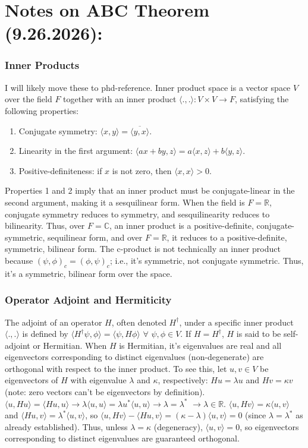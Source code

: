 \documentclass[11pt]{article}
\begin{document}
    \section*{Notes on ABC Theorem (9.26.2026):}
	\subsubsection*{Inner Products}
	I will likely move these to phd-reference. Inner product space is a vector space $V$ over the field $F$ together with an inner product $\langle ., .\rangle: V\times V\rightarrow F$, satisfying the following properties:
	\begin{enumerate}
		\item Conjugate symmetry: $\langle x, y\rangle = \overline{\langle y, x \rangle}$.
		\item Linearity in the first argument: $\langle ax + by, z\rangle = a\langle x, z\rangle + b \langle y, z\rangle$.
		\item Positive-definiteness: if $x$ is not zero, then $\langle x, x\rangle > 0$.
	\end{enumerate}
	Properties 1 and 2 imply that an inner product must be conjugate-linear in the second argument, making it a sesquilinear form. When the field is $F=\mathbb{R}$, conjugate symmetry reduces to symmetry, and sesquilinearity reduces to bilinearity. Thus, over $F=\mathbb{C}$, an inner product is a positive-definite, conjugate-symmetric, sequilinear form, and over $F=\mathbb{R}$, it reduces to a positive-definite, symmetric, bilinear form. The c-product is not technically an inner product because $(\psi, \phi)_c = (\phi,\psi)_c$; i.e., it's symmetric, not conjugate symmetric. Thus, it's a symmetric, bilinear form over the space.
	
	\subsubsection*{Operator Adjoint and Hermiticity}
	The adjoint of an operator $H$, often denoted $H^\dagger$, under a specific inner product $\langle ., .\rangle$ is defined by $\langle H^\dagger \psi, \phi\rangle = \langle \psi, H\phi\rangle$ $\forall$ $\psi, \phi\in V$. If $H=H^\dagger$, $H$ is said to be self-adjoint or Hermitian. When $H$ is Hermitian, it's eigenvalues are real and all eigenvectors corresponding to distinct eigenvalues (non-degenerate) are orthogonal with respect to the inner product. To see this, let $u,v\in V$ be eigenvectors of $H$ with eigenvalue $\lambda$ and $\kappa$, respectively: $Hu =\lambda u$ and $Hv=\kappa v$ (note: zero vectors can't be eigenvectors by definition). $\langle u, Hu\rangle = \langle H u, u\rangle \rightarrow \lambda\langle u, u\rangle =\lambda u^*\langle u, u\rangle \rightarrow \lambda=\lambda^*$ $\rightarrow \lambda \in \mathbb{R}$. $\langle u, Hv\rangle = \kappa\langle u, v\rangle$ and $\langle Hu, v\rangle = \lambda^*\langle u, v\rangle$, so $\langle u, Hv\rangle - \langle Hu, v\rangle = (\kappa - \lambda)\langle u, v\rangle = 0$ (since $\lambda=\lambda^*$ as already established). Thus, unless $\lambda = \kappa$ (degeneracy), $\langle u,  v\rangle=0$, so eigenvectors corresponding to distinct eigenvalues are guaranteed orthogonal.
	
\end{document}
